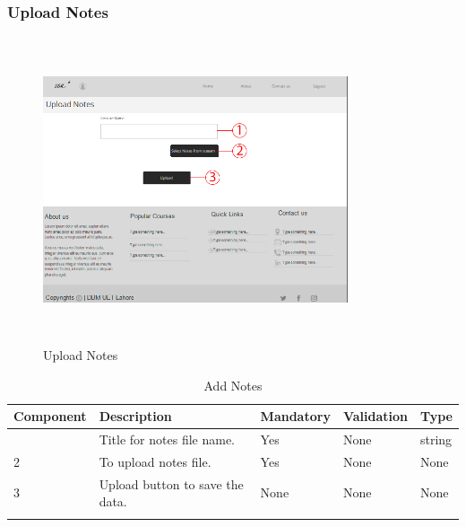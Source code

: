 \documentclass[12pt]{article}
\begin{document}
\subsubsection{Upload Notes}
\begin{figure}[H]
  \centering
  \includegraphics[width=9cm, height=9cm]{UploadNotesPage}
  \caption{Upload Notes}
\end{figure}

\newpage
\begin{longtable}{|>{\raggedright\arraybackslash}p{2.5cm}|>{\raggedright\arraybackslash}p{4cm}|>{\raggedright\arraybackslash}p{2.2cm}|>{\raggedright\arraybackslash}p{2cm}|>{\raggedright\arraybackslash}p{2cm}|}
\hline
\textbf{Component} & \textbf{Description} & \textbf{Mandatory} & \textbf{Validation} & \textbf{Type}\\
\hline
1 &
Title for notes file name. &
Yes &
None &
string \\
\hline

2 &
To upload notes file. &
Yes &
None &
None \\
\hline

3 &
Upload button to save the data. &
None &
None &
None \\
\hline

\caption{Add Notes}
\end{longtable}
\end{document}
